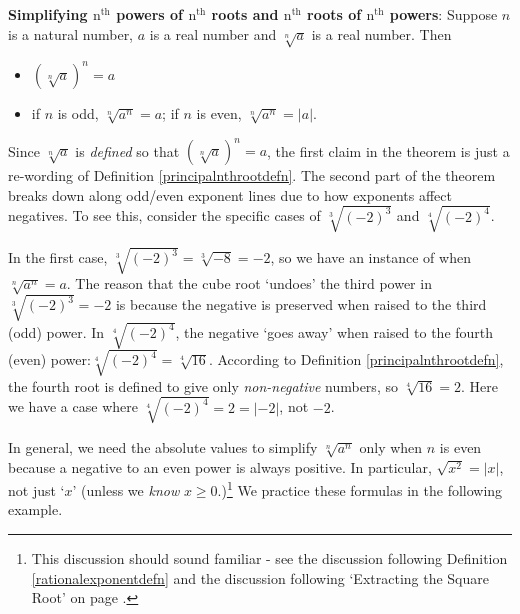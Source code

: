 \documentclass{ximera}
\begin{document}
\colorbox{ResultColor}{\bbm

\begin{theorem}\label{simplifyradicals} \textbf{Simplifying $\text{n}^{\text{th}}$ powers of $\text{n}^{\text{th}}$ roots and $\text{n}^{\text{th}}$ roots of $\text{n}^{\text{th}}$ powers}:  Suppose $n$ is a natural number, $a$ is a real number and $\sqrt[n]{a}$ is a real number.  Then

\begin{itemize}

\item $(\sqrt[n]{a})^{n} = a$

\item  if $n$ is odd, $\sqrt[n]{a^{n}} = a$; if $n$ is even, $\sqrt[n]{a^{n}} = |a|$.

\end{itemize}

\end{theorem}


\medskip

Since $\sqrt[n]{a}$ is \textit{defined} so that $(\sqrt[n]{a})^n = a$,  the first claim in the theorem is just a re-wording of  Definition \ref{principalnthrootdefn}.  The second part of the theorem breaks down along odd/even exponent lines due to how exponents affect negatives. To see this, consider the specific cases of $\sqrt[3]{(-2)^3}$ and $\sqrt[4]{(-2)^{4}}$.  

\medskip

In the first case,  $\sqrt[3]{(-2)^3} =\sqrt[3]{-8} = -2$, so we have an instance of when $\sqrt[n]{a^{n}} = a$.  The reason that the cube root `undoes' the third power in $\sqrt[3]{(-2)^3} = -2$ is because the negative is preserved when raised to the third (odd) power.  In  $\sqrt[4]{(-2)^{4}}$,  the negative `goes away' when raised to the fourth (even) power:$\sqrt[4]{(-2)^{4}} = \sqrt[4]{16}$.  According to Definition \ref{principalnthrootdefn}, the fourth root is defined to give only \textit{non-negative} numbers, so $\sqrt[4]{16} = 2$.  Here we have a case where $\sqrt[4]{(-2)^{4}} = 2 = |-2|$, not $-2$. 

\medskip

In general, we need the absolute values to simplify $\sqrt[n]{a^{n}}$ only when $n$ is even because a negative to an even power is always positive.  In particular, $\sqrt{x^2} = |x|$, not just `$x$' (unless we \textit{know} $x \geq 0$.)\footnote{This discussion should sound familiar - see the discussion following Definition \ref{rationalexponentdefn} and the discussion following `Extracting the Square Root' on page \pageref{extractingthesquareroot}.}  We practice these formulas in the following example.

}
\end{document}
